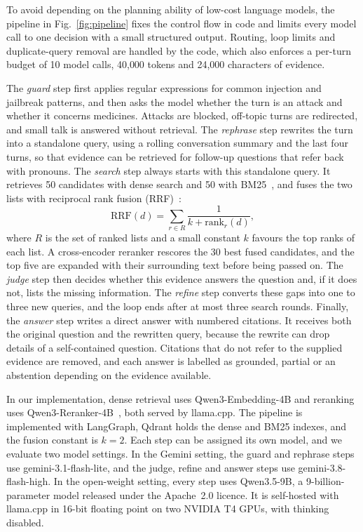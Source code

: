 To avoid depending on the planning ability of low-cost language models, the pipeline in Fig.~\ref{fig:pipeline} fixes the control flow in code and limits every model call to one decision with a small structured output. Routing, loop limits and duplicate-query removal are handled by the code, which also enforces a per-turn budget of 10 model calls, 40{,}000 tokens and 24{,}000 characters of evidence.

The \emph{guard} step first applies regular expressions for common injection and jailbreak patterns, and then asks the model whether the turn is an attack and whether it concerns medicines. Attacks are blocked, off-topic turns are redirected, and small talk is answered without retrieval. The \emph{rephrase} step rewrites the turn into a standalone query, using a rolling conversation summary and the last four turns, so that evidence can be retrieved for follow-up questions that refer back with pronouns. The \emph{search} step always starts with this standalone query. It retrieves 50 candidates with dense search and 50 with BM25~\cite{robertson2009bm25}, and fuses the two lists with reciprocal rank fusion (RRF)~\cite{cormack2009rrf}:
\begin{equation}\label{eq:rrf}
\mathrm{RRF}(d)=\sum_{r\in R}\frac{1}{k+\mathrm{rank}_r(d)},
\end{equation}
\noindent where $R$ is the set of ranked lists and a small constant $k$ favours the top ranks of each list. A cross-encoder reranker rescores the 30 best fused candidates, and the top five are expanded with their surrounding text before being passed on. The \emph{judge} step then decides whether this evidence answers the question and, if it does not, lists the missing information. The \emph{refine} step converts these gaps into one to three new queries, and the loop ends after at most three search rounds. Finally, the \emph{answer} step writes a direct answer with numbered citations. It receives both the original question and the rewritten query, because the rewrite can drop details of a self-contained question. Citations that do not refer to the supplied evidence are removed, and each answer is labelled as grounded, partial or an abstention depending on the evidence available.

In our implementation, dense retrieval uses Qwen3-Embedding-4B and reranking uses Qwen3-Reranker-4B~\cite{zhang2025qwen3emb}, both served by llama.cpp. The pipeline is implemented with LangGraph, Qdrant holds the dense and BM25 indexes, and the fusion constant is $k=2$. Each step can be assigned its own model, and we evaluate two model settings. In the Gemini setting, the guard and rephrase steps use gemini-3.1-flash-lite, and the judge, refine and answer steps use gemini-3.8-flash-high. In the open-weight setting, every step uses Qwen3.5-9B, a 9-billion-parameter model released under the Apache~2.0 licence. It is self-hosted with llama.cpp in 16-bit floating point on two NVIDIA T4 GPUs, with thinking disabled.

